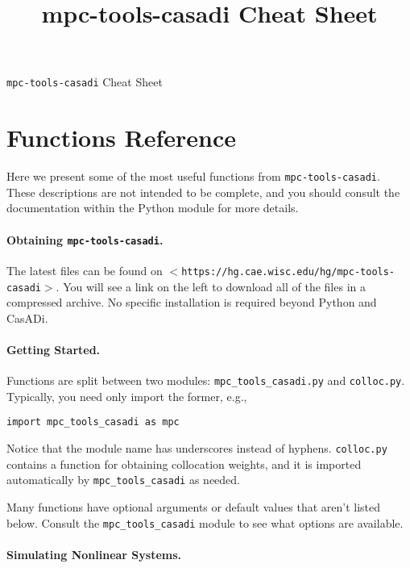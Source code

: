 \documentclass{article}
\title{mpc-tools-casadi Cheat Sheet}
\newcommand{\smallurl}[2][\scriptsize]{\texttt{#1$<$#2$>$}}
\newcommand{\casadi}{CasADi}
\begin{document}

\begin{center}
    \LARGE \texttt{mpc-tools-casadi} Cheat Sheet
\end{center}

\section{Functions Reference}

Here we present some of the most useful functions from \texttt{mpc-tools-casadi}.
These descriptions are not intended to be complete, and you should consult the documentation within the Python module for more details.

\begin{multicols}{2}

\paragraph*{Obtaining \texttt{mpc-tools-casadi}.}

The latest files can be found on \smallurl{https://hg.cae.wisc.edu/hg/mpc-tools-casadi}.
You will see a link on the left to download all of the files in a compressed archive.
No specific installation is required beyond Python and \casadi{}.

\paragraph*{Getting Started.}

Functions are split between two modules: \texttt{mpc\_tools\_casadi.py} and \texttt{colloc.py}.
Typically, you need only import the former, e.g.,
%
\begin{lstlisting}[frame=L]
import mpc_tools_casadi as mpc
\end{lstlisting}
%
Notice that the module name has underscores instead of hyphens.
\texttt{colloc.py} contains a function for obtaining collocation weights, and it is imported automatically by \texttt{mpc\_tools\_casadi} as needed.

Many functions have optional arguments or default values that aren't listed below.
Consult the \texttt{mpc\_tools\_casadi} module to see what options are available.

\paragraph*{Simulating Nonlinear Systems.}


\end{multicols}
\end{document}
